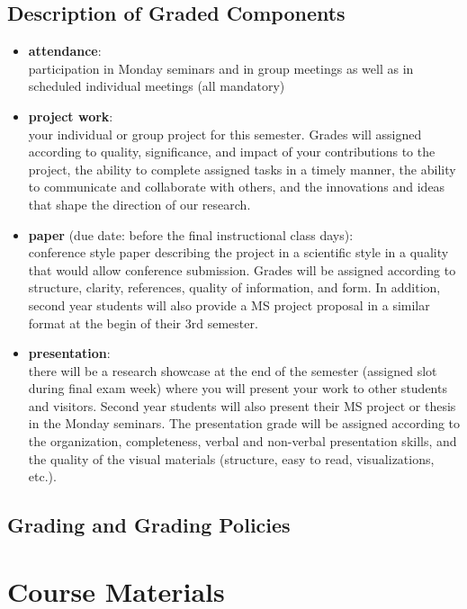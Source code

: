 \documentclass[letterpaper,oneside,10pt]{scrartcl}
\begin{document}
    \subsection{Description of Graded Components}
        \begin{itemize}
            \item   \textbf{attendance}:\\ participation in Monday seminars and in group meetings as well as in scheduled individual meetings (all mandatory)
            \item   \textbf{project work}:\\ your individual or group project for this semester. Grades will assigned according to quality, significance, and impact of your contributions to the project, the ability to complete assigned tasks in a timely manner, the ability to communicate and collaborate with others, and the innovations and ideas that shape the direction of our research.
            \item   \textbf{paper} (due date: before the final instructional class days):\\ conference style paper describing the project in a scientific style in a quality that would allow conference submission. Grades will be assigned according to structure, clarity, references, quality of information, and form. In addition, second year students will also provide a MS project proposal in a similar format at the begin of their 3rd semester.
            \item   \textbf{presentation}:\\ there will be a research showcase at the end of the semester (assigned slot during final exam week) where you will present your work to other students and visitors. Second year students will also present their MS project or thesis in the Monday seminars. The presentation grade will be assigned according to the organization, completeness, verbal and non-verbal presentation skills, and the quality of the visual materials (structure, easy to read, visualizations, etc.).
        \end{itemize}
        
    \subsection{Grading and Grading Policies}
         

    \section{Course Materials}
\end{document}
